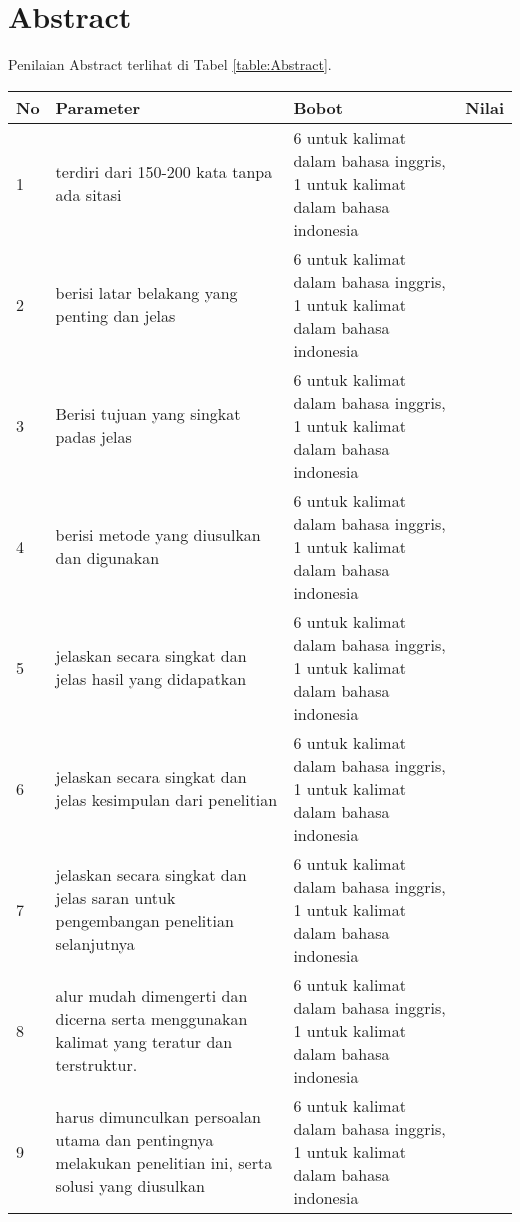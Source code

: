 \section{Abstract}

Penilaian Abstract terlihat di Tabel \ref{table:Abstract}.
\begin{longtable}{|p{}|p{}|p{}|p{}|}
\hline
No&Parameter&Bobot&Nilai\\
\hline


1 &terdiri dari 150-200 kata tanpa ada sitasi&6 untuk kalimat dalam bahasa inggris, 1 untuk kalimat dalam bahasa indonesia& \\ \hline

2 &berisi latar belakang yang penting dan jelas&6 untuk kalimat dalam bahasa inggris, 1 untuk kalimat dalam bahasa indonesia& \\ \hline

3 &Berisi tujuan yang singkat padas jelas&6 untuk kalimat dalam bahasa inggris, 1 untuk kalimat dalam bahasa indonesia& \\ \hline

4 &berisi metode yang diusulkan dan digunakan&6 untuk kalimat dalam bahasa inggris, 1 untuk kalimat dalam bahasa indonesia& \\ \hline

5 &jelaskan secara singkat dan jelas hasil yang didapatkan&6 untuk kalimat dalam bahasa inggris, 1 untuk kalimat dalam bahasa indonesia& \\ \hline

6 &jelaskan secara singkat dan jelas kesimpulan dari penelitian&6 untuk kalimat dalam bahasa inggris, 1 untuk kalimat dalam bahasa indonesia& \\ \hline

7 &jelaskan secara singkat dan jelas saran untuk pengembangan penelitian selanjutnya&6 untuk kalimat dalam bahasa inggris, 1 untuk kalimat dalam bahasa indonesia& \\ \hline

8 &alur mudah dimengerti dan dicerna serta menggunakan kalimat yang teratur dan terstruktur.&6 untuk kalimat dalam bahasa inggris, 1 untuk kalimat dalam bahasa indonesia& \\ \hline

9 &harus dimunculkan persoalan utama dan pentingnya melakukan penelitian ini, serta solusi yang diusulkan&6 untuk kalimat dalam bahasa inggris, 1 untuk kalimat dalam bahasa indonesia& \\ \hline


\end{longtable}
